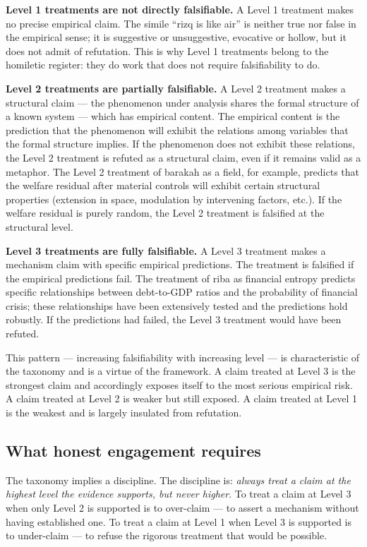 \textbf{Level 1 treatments are not directly falsifiable.} A Level 1
treatment makes no precise empirical claim. The simile ``rizq is
like air'' is neither true nor false in the empirical sense; it is
suggestive or unsuggestive, evocative or hollow, but it does not
admit of refutation. This is why Level 1 treatments belong to the
homiletic register: they do work that does not require falsifiability
to do.

\textbf{Level 2 treatments are partially falsifiable.} A Level 2
treatment makes a structural claim --- the phenomenon under analysis
shares the formal structure of a known system --- which has empirical
content. The empirical content is the prediction that the phenomenon
will exhibit the relations among variables that the formal structure
implies. If the phenomenon does not exhibit these relations, the
Level 2 treatment is refuted as a structural claim, even if it
remains valid as a metaphor. The Level 2 treatment of barakah as a
field, for example, predicts that the welfare residual after material
controls will exhibit certain structural properties (extension in
space, modulation by intervening factors, etc.). If the welfare
residual is purely random, the Level 2 treatment is falsified at
the structural level.

\textbf{Level 3 treatments are fully falsifiable.} A Level 3
treatment makes a mechanism claim with specific empirical predictions.
The treatment is falsified if the empirical predictions fail. The
treatment of riba as financial entropy predicts specific
relationships between debt-to-GDP ratios and the probability of
financial crisis; these relationships have been extensively tested
and the predictions hold robustly. If the predictions had failed,
the Level 3 treatment would have been refuted.

This pattern --- increasing falsifiability with increasing level ---
is characteristic of the taxonomy and is a virtue of the framework.
A claim treated at Level 3 is the strongest claim and accordingly
exposes itself to the most serious empirical risk. A claim treated at
Level 2 is weaker but still exposed. A claim treated at Level 1 is
the weakest and is largely insulated from refutation.

\subsection{What honest engagement requires}

The taxonomy implies a discipline. The discipline is: \emph{always
treat a claim at the highest level the evidence supports, but never
higher}. To treat a claim at Level 3 when only Level 2 is supported
is to over-claim --- to assert a mechanism without having
established one. To treat a claim at Level 1 when Level 3 is
supported is to under-claim --- to refuse the rigorous treatment that
would be possible.

